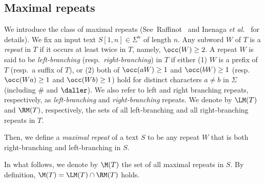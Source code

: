 

\subsection{Maximal repeats}
\label{sec:mr}
We introduce the class of maximal repeats (See~Raffinot~\cite{raffinot2001maximal} and Inenaga \textit{et al.}~\cite{inenaga2005line} for details). 
We fix an input text $S[1,n] \in \Sigma^n$ of length $n$.
Any subword $W$ of $T$ is a \textit{repeat} in $T$ if it occurs at least twice in $T$, namely, $\occ(W) \ge 2$.
A repeat $W$ is said to be \textit{left-branching} (resp.~\textit{right-branching}) in $T$ if either 
(1) $W$ is a prefix  of $T$ (resp.~a suffix of $T$), or 
(2) both of $\occ(aW) \ge 1$ and $\occ(bW) \ge 1$ (resp.~$\occ(Wa) \ge 1$ and $\occ(Wb) \ge 1$) hold for distinct characters $a\not= b$ in $\Sigma$ (including $\#$ and $\daller$). We also refer to left and right branching repeats, respectively, as \textit{left-branching} and \textit{right-branching} repeats. We denote by $\LM(T)$ and $\RM(T)$, respectively, the sets of all left-branching and all right-branching repeats in $T$.

\begin{definition}\rm 
  Then, we define a \textit{maximal repeat} of a text $S$ to be any repeat $W$ that is both right-branching and left-branching in $S$. 
\end{definition}


In what follows, we denote by $\M(T)$ the set of all maximal repeats in $S$.
By definition, $\M(T) = \LM(T)\cap\RM(T)$ holds.

